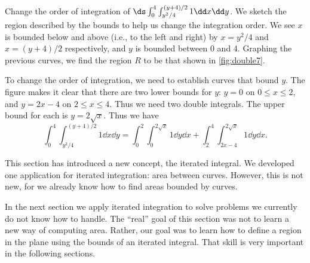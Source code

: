 \begin{example}\label{ex_double7}
Change the order of integration of $\ds\int_0^4\int_{y^2/4}^{(y+4)/2}1\dd x\dd y$.
\solution
We sketch the region described by the bounds to help us change the integration order. We see $x$ is bounded below and above (i.e., to the left and right) by $x=y^2/4$ and $x=(y+4)/2$ respectively, and $y$ is bounded between 0 and 4. Graphing the previous curves, we find the region $R$ to be that shown in \autoref{fig:double7}.


To change the order of integration, we need to establish curves that bound $y$. The figure makes it clear that there are two lower bounds for $y$: $y=0$ on $0\leq x\leq 2$, and $y=2x-4$ on $2\leq x\leq 4$. Thus we need two double integrals. The upper bound for each is $y=2\sqrt{x}$. Thus we have
\[
\int_0^4\int_{y^2/4}^{(y+4)/2}1\dd x\dd y
= \int_0^2\int_0^{2\sqrt{x}} 1\dd y\dd x + \int_2^4\int_{2x-4}^{2\sqrt{x}}1\dd y\dd x.
\]
\end{example}

This section has introduced a new concept, the iterated integral. We developed one application for iterated integration: area between curves. However, this is not new, for we already know how to find areas bounded by curves.

In the next section we apply iterated integration to solve problems we currently do not know how to handle. The ``real'' goal of this section was not to learn a new way of computing area. Rather, our goal was to learn how to define a region in the plane using the bounds of an iterated integral. That skill is very important in the following sections.

